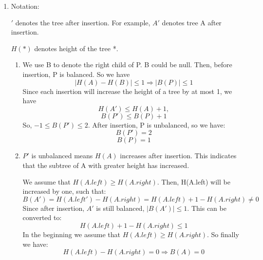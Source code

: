 \documentclass[12pt,a4paper]{article}
\makeatletter
\newtheorem*{solution}{Solution}
\theoremstyle{definition}
\renewenvironment{solution}[1][Solution] {\par\pushQED{\qed}\normalfont\topsep6\p@\@plus6\p@\relax\trivlist\item[\hskip\labelsep\bfseries#1\@addpunct{.}]\ignorespaces}{\popQED\endtrivlist\@endpefalse} \makeatother
\makeatother
\begin{document}
\begin{enumerate}
\begin{solution} 

Notation: 

$'$ denotes the tree after insertion. For example, $A'$ denotes tree A after insertion.

$H(*)$ denotes height of the tree *.
\begin{enumerate}
    \item 
    We use B to denote the right child of P. B could be null. Then, before insertion, P is balanced. So we have 
    $$|H(A)-H(B)|\leq 1 \Rightarrow |B(P)|\leq 1$$
    Since each insertion will increase the height of a tree by at most 1, we have $$H(A')\leq H(A)+1,$$$$B(P')\leq B(P)+1$$
    So, $-1\leq B(P')\leq 2$. After insertion, P is unbalanced, so we have: $$B(P')=2$$ $$B(P)=1$$
    
    \item $P'$ is unbalanced means $H(A)$ increases after insertion. This indicates that the subtree of A with greater height has increased.
    
    We assume that $H(A.left)\geq H(A.right)$. Then, H(A.left) will be increased by one, such that:
    $$B(A')=H(A.left')-H(A.right)=H(A.left)+1-H(A.right) \neq 0$$
    Since after insertion, $A'$ is still balanced, $|B(A')|\leq 1$. This can be converted to:
    $$H(A.left)+1-H(A.right)\leq 1$$
    In the beginning we assume that $H(A.left)\geq H(A.right)$. So finally we have:
    $$H(A.left)-H(A.right)=0\Rightarrow B(A)=0$$
    
\end{enumerate}
\end{solution}

\end{enumerate}

\end{document}

